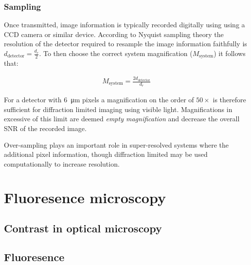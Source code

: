 \subsubsection{Sampling}

Once transmitted, image information is typically recorded digitally using using a CCD camera or similar device.
According to Nyquist sampling theory the resolution of the detector required to resample the image information faithfully is $d_\text{detector} = \frac{d_r}{2}$.
To then choose the correct system magnification ($M_\text{system}$) it follows that:

\begin{align}
    M_\text{system} = \frac{2d_\text{detector}}{d_r}
\end{align}

For a detector with \SI{6}{\micro\meter} pixels a magnification on the order of $50\times$ is therefore sufficient for diffraction limited imaging using visible light.
Magnifications in excessive of this limit are deemed \emph{empty magnification} and decrease the overall SNR of the recorded image.

Over-sampling plays an important role in super-resolved systems where the additional pixel information, though diffraction limited may be used computationally to increase resolution.

%
%


\section{Fluoresence microscopy}
\subsection{Contrast in optical microscopy}
\subsection{Fluoresence}

